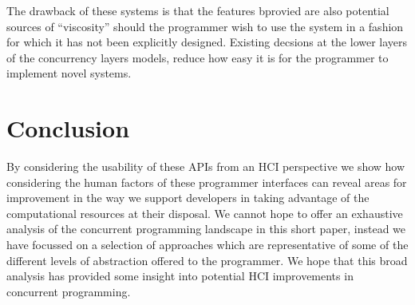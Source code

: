 \documentclass{sig-alternate}
\begin{document}
The drawback of these systems is that the features bprovied are also potential sources of ``viscosity'' should the programmer wish to use the system in a fashion for which it has not been explicitly designed. Existing decsions at the lower layers of the concurrency layers models, reduce how easy it is for the programmer to implement novel systems.

\section{Conclusion}
By considering the usability of these APIs from an HCI perspective we show how considering the human factors of these programmer interfaces can reveal areas for improvement in the way we support developers in taking advantage of the computational resources at their disposal. We cannot hope to offer an exhaustive analysis of the concurrent programming landscape in this short paper, instead we have focussed on a selection of approaches which are representative of some of the different levels of abstraction offered to the programmer. We hope that this broad analysis has provided some insight into potential HCI improvements in concurrent programming.



\end{document}
